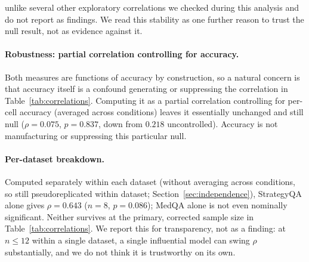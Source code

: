 \documentclass[letterpaper]{article} %
\begin{document}
unlike several other exploratory correlations we checked during this analysis and do not report as findings. We read this stability as one further reason to trust the null result, not as evidence against it. \paragraph{Robustness: partial correlation controlling for accuracy.} Both measures are functions of accuracy by construction, so a natural concern is that accuracy itself is a confound generating or suppressing the correlation in Table~\ref{tab:correlations}. Computing it as a partial correlation controlling for per-cell accuracy (averaged across conditions) leaves it essentially unchanged and still null ($\rho{=}0.075$, $p{=}0.837$, down from $0.218$ uncontrolled). Accuracy is not manufacturing or suppressing this particular null. \paragraph{Per-dataset breakdown.} Computed separately within each dataset (without averaging across conditions, so still pseudoreplicated within dataset; Section~\ref{sec:independence}), StrategyQA alone gives $\rho{=}0.643$ ($n{=}8$, $p{=}0.086$); MedQA alone is not even nominally significant. Neither survives at the primary, corrected sample size in Table~\ref{tab:correlations}. We report this for transparency, not as a finding: at $n{\leq}12$ within a single dataset, a single influential model can swing $\rho$ substantially, and we do not think it is trustworthy on its own.
\end{document}
